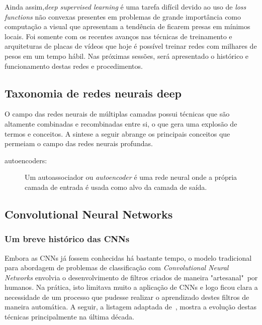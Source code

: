 Ainda assim,\emph{deep supervised learning} é uma tarefa difícil devido ao uso
de \emph{loss functions} não convexas presentes em problemas de grande
importância como computação a visual que apresentam a tendência de ficarem
presas em mínimos locais. Foi somente com os recentes avanços nas técnicas de
treinamento e arquiteturas de placas de vídeos que hoje é possível treinar
redes com milhares de pesos em um tempo hábil. Nas próximas sessões, será
apresentado o histórico e funcionamento destas redes e procedimentos.

\subsection{Taxonomia de redes neurais deep}

O campo das redes neurais de múltiplas camadas possui técnicas que são
altamente combinadas e recombinadas entre si, o que gera uma explosão de termos
e conceitos. A sintese a seguir abrange os principais conceitos que permeiam
o campo das redes neurais profundas.

\begin{description}

  \item[autoencoders:] Um autoassociador ou \emph{autoencoder} é uma rede neural onde a própria camada de entrada é usada como alvo da camada de saída. \ 

\end{description}

\subsection{Convolutional Neural Networks}

\subsubsection{Um breve histórico das CNNs}

Embora as CNNs já fossem conhecidas há bastante tempo, o modelo tradicional
para abordagem de problemas de classificação com \emph{Convolutional Neural
  Networks} envolvia o desenvolvimento de filtros criados de maneira
"artesanal"~por humanos. Na prática, isto limitava muito a aplicação de CNNs e
logo ficou clara a necessidade de um processo que pudesse realizar o
aprendizado destes filtros de maneira automática. A seguir, a listagem adaptada
de~\citet{cs231n}, mostra a evolução destas técnicas principalmente na última
década.

